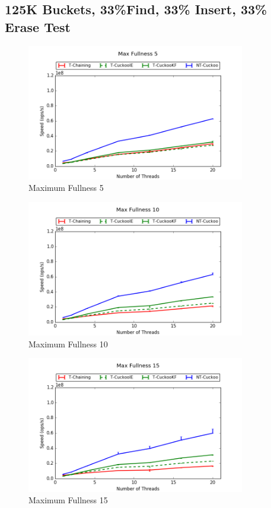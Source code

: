 \subsection{125K Buckets, 33\%Find, 33\% Insert, 33\% Erase Test}
\begin{figure}[H]
    \centering
	\includegraphics[width=0.85\textwidth]{maps/5HM125K:F34,I33,E33.png} 
        \caption*{Maximum Fullness 5}
\end{figure}
\begin{figure}[H]
    \centering
	\includegraphics[width=0.85\textwidth]{maps/10HM125K:F34,I33,E33.png} 
        \caption*{Maximum Fullness 10}
\end{figure}
\begin{figure}[H]
    \centering
	\includegraphics[width=0.85\textwidth]{maps/15HM125K:F34,I33,E33.png} 
        \caption*{Maximum Fullness 15}
\end{figure}


